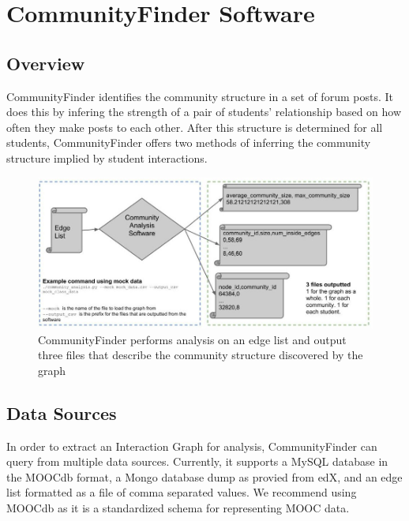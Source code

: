 \section{CommunityFinder Software}

\subsection{Overview}
CommunityFinder identifies the community structure in a set of forum posts. It does this by infering the strength of a pair of students' relationship based on how often they make posts to each other. After this structure is determined for all students, CommunityFinder offers two methods of inferring the community structure implied by student interactions. 

\begin{figure}[h]
 \centering
 \includegraphics[width=\linewidth]{step2.jpg}
 \caption{CommunityFinder performs analysis on an edge list and output three files that describe the community structure discovered by the graph}
\end{figure}



\subsection{Data Sources}
In order to extract an Interaction Graph for analysis, CommunityFinder can query from multiple data sources. Currently, it supports a MySQL database in the MOOCdb \cite{veeramachaneni2013moocdb} format, a Mongo database dump as provied from edX, and an edge list formatted as a file of comma separated values. We recommend using MOOCdb as it is a standardized schema for representing MOOC data.

